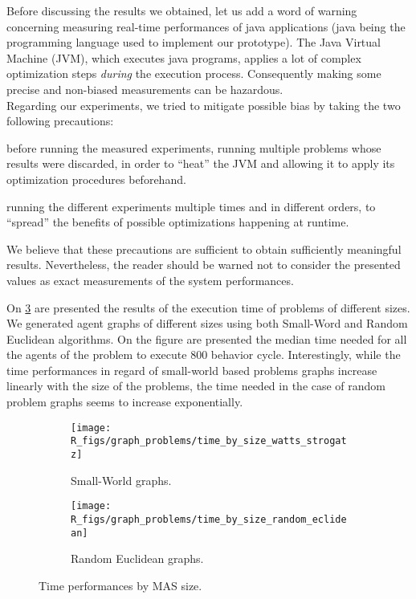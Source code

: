 Before discussing the results we obtained, let us add a word of warning concerning measuring real-time performances of java applications (java being the programming language used to implement our prototype). The Java Virtual Machine (JVM), which executes java programs, applies a lot of complex optimization steps \emph{during} the execution process. Consequently making some precise and non-biased measurements can be hazardous.\\
Regarding our experiments, we tried to mitigate possible bias by taking the two following precautions:
\begin{compactitem}
\item before running the measured experiments, running multiple problems whose results were discarded, in order to \enquote{heat} the JVM and allowing it to apply its optimization procedures beforehand.
\item running the different experiments multiple times and in different orders, to \enquote{spread} the benefits of possible optimizations happening at runtime.
\end{compactitem}
We believe that these precautions are sufficient to obtain sufficiently meaningful results. Nevertheless, the reader should be warned not to consider the presented values as exact measurements of the system performances.

On \figurename{} \ref{time_by_size_perfo} are presented the results of the execution time of problems of different sizes. We generated agent graphs of different sizes using both Small-Word and Random Euclidean algorithms. On the figure are presented the median time needed for all the agents of the problem to execute 800 behavior cycle. Interestingly, while the time performances in regard of small-world based problems graphs increase linearly with the size of the problems, the time needed in the case of random problem graphs seems to increase exponentially.

\begin{figure}
\centering

	\begin{subfigure}[b]{0.45\textwidth}
		\texttt{[image: R\_figs/graph\_problems/time\_by\_size\_watts\_strogatz]}
		\caption{Small-World graphs.}\label{time_by_size_perfo:ws}
	\end{subfigure}
	\begin{subfigure}[b]{0.45\textwidth}
			\texttt{[image: R\_figs/graph\_problems/time\_by\_size\_random\_eclidean]}
		\caption{Random Euclidean graphs.}\label{time_by_size_perfo:re}
	\end{subfigure}

\caption{Time performances by MAS size.}\label{time_by_size_perfo}
\end{figure}

